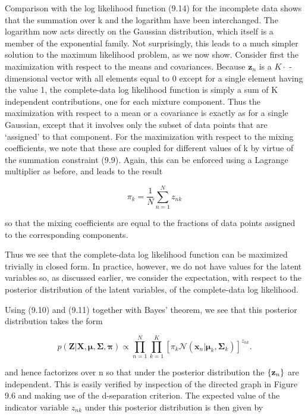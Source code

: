 \documentclass[
  10
]{article}
\begin{document}
Comparison with the log likelihood function (9.14) for the incomplete
data shows that the summation over k and the logarithm have been
interchanged. The logarithm now acts directly on the Gaussian
distribution, which itself is a member of the exponential family. Not
surprisingly, this leads to a much simpler solution to the maximum
likelihood problem, as we now show. Consider first the maximization with
respect to the means and covariances. Because \(\mathbf { z } _ { n }\)
is a \(K \cdot\) -dimensional vector with all elements equal to 0 except
for a single element having the value 1, the complete-data log
likelihood function is simply a sum of K independent contributions, one
for each mixture component. Thus the maximization with respect to a mean
or a covariance is exactly as for a single Gaussian, except that it
involves only the subset of data points that are `assigned' to that
component. For the maximization with respect to the mixing coefficients,
we note that these are coupled for different values of k by virtue of
the summation constraint (9.9). Again, this can be enforced using a
Lagrange multiplier as before, and leads to the result

\[
\pi_ {k} = \frac {1}{N} \sum_ {n = 1} ^ {N} z _ {n k}\tag{9.37}
\]

so that the mixing coefficients are equal to the fractions of data
points assigned to the corresponding components.

Thus we see that the complete-data log likelihood function can be
maximized trivially in closed form. In practice, however, we do not have
values for the latent variables so, as discussed earlier, we consider
the expectation, with respect to the posterior distribution of the
latent variables, of the complete-data log likelihood.

Using (9.10) and (9.11) together with Bayes' theorem, we see that this
posterior distribution takes the form

\[
p (\mathbf {Z} | \mathbf {X}, \boldsymbol {\mu}, \boldsymbol {\Sigma}, \boldsymbol {\pi}) \propto \prod_ {n = 1} ^ {N} \prod_ {k = 1} ^ {K} [ \pi_ {k} \mathcal {N} (\mathbf {x} _ {n} | \boldsymbol {\mu} _ {k}, \boldsymbol {\Sigma} _ {k}) ] ^ {z _ {n k}}.\tag{9.38}
\]

and hence factorizes over n so that under the posterior distribution the
\(\left\{ { { \bf { z } } _ { n } } \right\}\) are independent. This is
easily verified by inspection of the directed graph in Figure 9.6 and
making use of the d-separation criterion. The expected value of the
indicator variable \(z _ { n k }\) under this posterior distribution is
then given by
\end{document}
